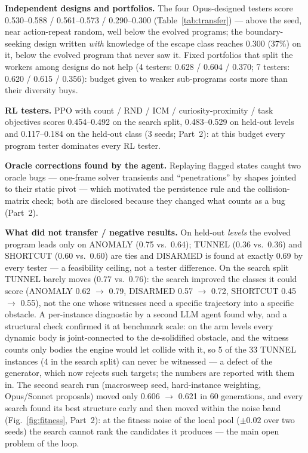 \textbf{Independent designs and portfolios.} The four Opus-designed testers score 0.530--0.588 / 0.561--0.573 / 0.290--0.300
(Table~\ref{tab:transfer}) --- above the seed, near action-repeat random, well below the evolved programs; the boundary-seeking design
written \emph{with} knowledge of the escape class reaches 0.300 (37\%) on it, below the evolved program that never saw it. Fixed
portfolios that split the workers among designs do not help (4 testers: 0.628 / 0.604 / 0.370; 7 testers: 0.620 / 0.615 / 0.356):
budget given to weaker sub-programs costs more than their diversity buys.

\textbf{RL testers.} PPO with count / RND / ICM / curiosity-proximity / task objectives scores 0.454--0.492 on the search split,
0.483--0.529 on held-out levels and 0.117--0.184 on the held-out class (3 seeds; Part~2): at this budget every program tester
dominates every RL tester.

\textbf{Oracle corrections found by the agent.} Replaying flagged states caught two oracle bugs --- one-frame solver transients and
``penetrations'' by shapes jointed to their static pivot --- which motivated the persistence rule and the collision-matrix check; both are
disclosed because they changed what counts as a bug (Part~2).

\textbf{What did not transfer / negative results.} On held-out \emph{levels} the evolved program leads only on ANOMALY (0.75 vs.\ 0.64);
TUNNEL (0.36 vs.\ 0.36) and SHORTCUT (0.60 vs.\ 0.60) are ties and DISARMED is found at exactly 0.69 by every tester --- a feasibility
ceiling, not a tester difference. On the search split TUNNEL barely moves (0.77 vs.\ 0.76): the search improved the classes it could score
(ANOMALY 0.62 $\to$ 0.79, DISARMED 0.57 $\to$ 0.72, SHORTCUT 0.45 $\to$ 0.55), not the one whose witnesses need a specific trajectory into
a specific obstacle. A per-instance diagnostic by a second LLM agent found why, and a structural check confirmed it at benchmark scale: on the arm levels every
dynamic body is joint-connected to the de-solidified obstacle, and the witness counts only bodies the engine would let collide with it,
so 5 of the 33 TUNNEL instances (4 in the search split) can never be witnessed --- a defect of the generator, which now rejects such
targets; the numbers are reported with them in. The second search run (macrosweep seed, hard-instance weighting, Opus/Sonnet proposals) moved only 0.606 $\to$ 0.621 in 60
generations, and every search found its best structure early and then moved within the noise band (Fig.~\ref{fig:fitness}, Part~2): at the fitness
noise of the local pool ($\pm0.02$ over two seeds) the search cannot rank the candidates it produces --- the main open problem of the loop.
